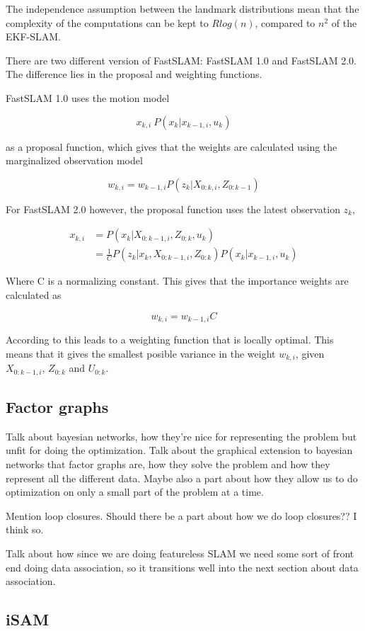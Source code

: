 The independence assumption between the landmark distributions mean that the complexity of the computations can be kept to $Rlog(n)$, compared to $n^2$ of the EKF-SLAM. 

There are two different version of FastSLAM: FastSLAM 1.0\cite{FastSLAM1} and FastSLAM 2.0\cite{FastSLAM2}. The difference lies in the proposal and weighting functions. 

FastSLAM 1.0 uses the motion model 

\begin{equation}
    x_{k,i} ~ P(x_k|x_{k-1,i},u_k)
\end{equation}

as a proposal function, which gives that the weights are calculated using the marginalized observation model

\begin{equation}
    w_{k,i} = w_{k-1,i}P(z_k|X_{0:k,i},Z_{0:k-1})
\end{equation}

For FastSLAM 2.0 however, the proposal function uses the latest observation $z_k$,

\begin{align}
    x_{k,i} &= P(x_k|X_{0:k-1,i},Z_{0:k},u_k) \\
    &= \frac{1}{C}P(z_k|x_k,X_{0:k-1,i},Z_{0:k})P(x_k|x_{k-1,i},u_k)
\end{align}

Where C is a normalizing constant. This gives that the importance weights are calculated as

\begin{equation}
    w_{k,i} = w_{k-1,i}C
\end{equation}

According to \cite{SLAMIntro} this leads to a weighting function that is locally optimal. This means that it gives the smallest posible variance in the weight $w_{k,i}$, given $X_{0:k-1,i}$, $Z_{0:k}$ and $U_{0:k}$.

\subsection{Factor graphs}

Talk about bayesian networks, how they're nice for representing the problem but unfit for doing the optimization. Talk about the graphical extension to bayesian networks that factor graphs are, how they solve the problem and how they represent all the different data. Maybe also a part about how they allow us to do optimization on only a small part of the problem at a time. 

Mention loop closures. Should there be a part about how we do loop closures?? I think so. 

Talk about how since we are doing featureless SLAM we need some sort of front end doing data association, so it transitions well into the next section about data association.

\subsection{iSAM}

